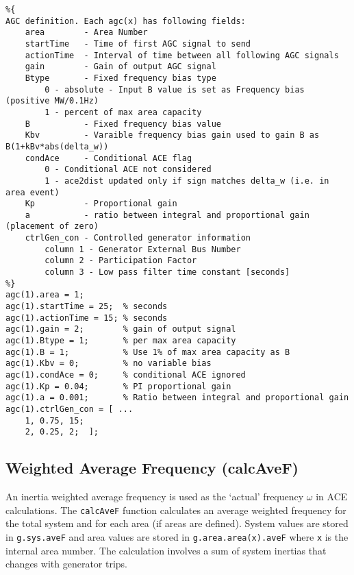 \begin{verbatim}
%{  
AGC definition. Each agc(x) has following fields:
    area        - Area Number 
    startTime   - Time of first AGC signal to send
    actionTime  - Interval of time between all following AGC signals
    gain        - Gain of output AGC signal
    Btype       - Fixed frequency bias type
        0 - absolute - Input B value is set as Frequency bias (positive MW/0.1Hz)
        1 - percent of max area capacity
    B           - Fixed frequency bias value
    Kbv         - Varaible frequency bias gain used to gain B as B(1+kBv*abs(delta_w))
    condAce     - Conditional ACE flag
        0 - Conditional ACE not considered
        1 - ace2dist updated only if sign matches delta_w (i.e. in area event)
    Kp          - Proportional gain
    a           - ratio between integral and proportional gain (placement of zero)
    ctrlGen_con - Controlled generator information
        column 1 - Generator External Bus Number
        column 2 - Participation Factor
        column 3 - Low pass filter time constant [seconds]
%}
agc(1).area = 1;
agc(1).startTime = 25;  % seconds
agc(1).actionTime = 15; % seconds
agc(1).gain = 2;        % gain of output signal
agc(1).Btype = 1;       % per max area capacity
agc(1).B = 1;           % Use 1% of max area capacity as B
agc(1).Kbv = 0;         % no variable bias
agc(1).condAce = 0;     % conditional ACE ignored
agc(1).Kp = 0.04;       % PI proportional gain
agc(1).a = 0.001;       % Ratio between integral and proportional gain
agc(1).ctrlGen_con = [ ...
    1, 0.75, 15;
    2, 0.25, 2;  ];
\end{verbatim}




\subsection{Weighted Average Frequency (calcAveF)} 
An inertia weighted average frequency is used as the `actual' frequency $\omega$ in ACE calculations.
The \verb|calcAveF| function calculates an average weighted frequency for the total system and for each area (if areas are defined).
System values are stored in \verb|g.sys.aveF| and area values are stored in \verb|g.area.area(x).aveF| where \verb|x| is the internal area number.
The calculation involves a sum of system inertias that changes with generator trips.


